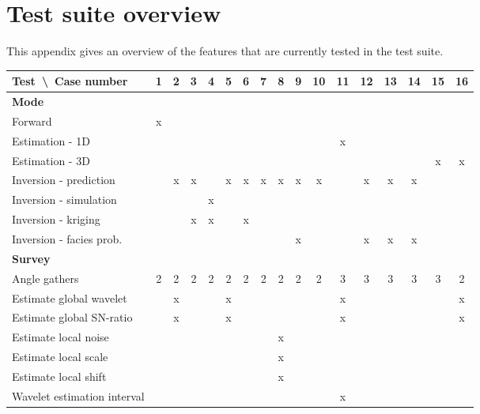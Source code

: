 \chapter{Test suite overview}
\label{sec:test-suite-overview}

This appendix gives an overview of the features that are currently
tested in the test suite. 

\newcommand{\mc}[1]{\multicolumn{17}{|l|}{\textbf{#1}}}



\small
\begin{tabular}{|l|c|c|c|c|c|c|c|c|c|c|c|c|c|c|c|c|}\hline
Test\ \textbackslash\ Case number    & 1 & 2 & 3 & 4 & 5 & 6 & 7 & 8 & 9 &10 &11 &12 &13 &14 &15 & 16\\ \hline
\mc{Mode}\\ \hline
\quad Forward                        & x &   &   &   &   &   &   &   &   &   &   &   &   &   &   &  \\ \hline
\quad Estimation - 1D                &   &   &   &   &   &   &   &   &   &   & x &   &   &   &   &  \\ \hline
\quad Estimation - 3D                &   &   &   &   &   &   &   &   &   &   &   &   &   &   & x & x\\ \hline
\quad Inversion - prediction         &   & x & x &   & x & x & x & x & x & x &   & x & x & x &   &  \\ \hline
\quad Inversion - simulation         &   &   &   & x &   &   &   &   &   &   &   &   &   &   &   &  \\ \hline
\quad Inversion - kriging            &   &   & x & x &   & x &   &   &   &   &   &   &   &   &   &  \\ \hline
\quad Inversion - facies prob.       &   &   &   &   &   &   &   &   & x &   &   & x & x & x &   &  \\ \hline

\mc{Survey}\\ \hline
\quad Angle gathers                  & 2 & 2 & 2 & 2 & 2 & 2 & 2 & 2 & 2 & 2 & 3 & 3 & 3 & 3 & 3 & 2\\ \hline
\quad Estimate global wavelet        &   & x &   &   & x &   &   &   &   &   & x &   &   &   &   & x\\ \hline
\quad Estimate global SN-ratio       &   & x &   &   & x &   &   &   &   &   & x &   &   &   &   & x\\ \hline
\quad Estimate local noise           &   &   &   &   &   &   &   & x &   &   &   &   &   &   &   &  \\ \hline
\quad Estimate local scale           &   &   &   &   &   &   &   & x &   &   &   &   &   &   &   &  \\ \hline
\quad Estimate local shift           &   &   &   &   &   &   &   & x &   &   &   &   &   &   &   &  \\ \hline
\quad Wavelet estimation interval    &   &   &   &   &   &   &   &   &   &   & x &   &   &   &   &  \\ \hline


\end{tabular}
